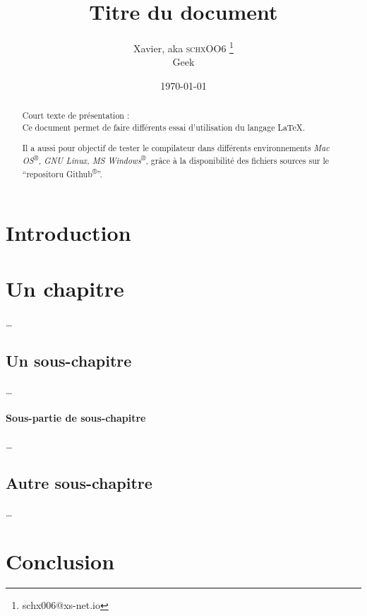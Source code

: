 \documentclass[frenchb, 12pt, twoside, a4paper]{article}
\title{Titre du document \latex{}}
\author{Xavier, aka \textsc{schxOO6} \thanks{schx006@xs-net.io} \\
Geek}
\date{\today}                           %
\begin{document}
\maketitle                              %

{
\renewcommand{\contentsname}{Sommaire}  %
\tableofcontents                        %
}


\begin{abstract}
Court texte de présentation : \\
Ce document permet de faire différents essai d'utilisation
du langage \LaTeX{}.

Il a aussi pour objectif de tester le compilateur \latex{}
dans différents environnements 
\emph{Mac OS\textsuperscript{®}, GNU Linux, MS Windows\textsuperscript{®}},
grâce à la disponibilité des fichiers sources sur le 
\enquote{repositoru Github\textsuperscript{®}}.
\end{abstract}



\section*{Introduction}


\section{Un chapitre}
…

\subsection{Un sous-chapitre}
…
\paragraph{Sous-partie de sous-chapitre}
…

\subsection{Autre sous-chapitre}
…

\section*{Conclusion}
\end{document}
